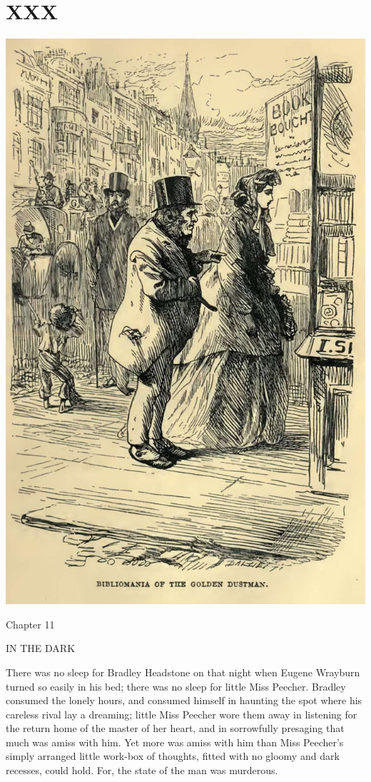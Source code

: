 
\chapter{XXX}

\includegraphics[scale=2.3]{03-05-01}

Chapter 11

IN THE DARK


There was no sleep for Bradley Headstone on that night when Eugene
Wrayburn turned so easily in his bed; there was no sleep for little
Miss Peecher. Bradley consumed the lonely hours, and consumed himself in
haunting the spot where his careless rival lay a dreaming; little Miss
Peecher wore them away in listening for the return home of the master
of her heart, and in sorrowfully presaging that much was amiss with him.
Yet more was amiss with him than Miss Peecher’s simply arranged little
work-box of thoughts, fitted with no gloomy and dark recesses, could
hold. For, the state of the man was murderous.

